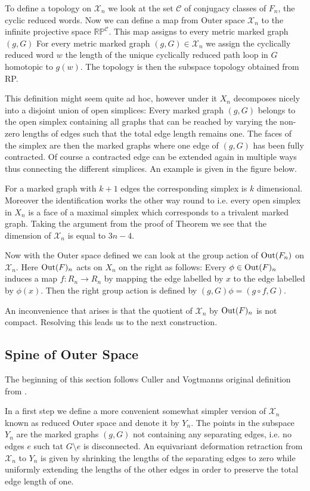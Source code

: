 To define a topology on $\mathcal{X}_{n}$ we look at the set $\mathcal{C}$ of conjugacy classes of $F_{n}$, the cyclic reduced words.
Now we can define a map from Outer space $\mathcal{X}_{n}$ to the infinite projective space $\mathbb{RP}^{\mathcal{C}}$.
This map assigns to every metric marked graph $(g,G)$
For every metric marked graph $(g,G) \in \mathcal{X}_{n}$ we assign the cyclically reduced word $w$
the length of the unique cyclically reduced path loop in $G$ homotopic to $g(w)$.
The topology is then the subspace topology obtained from RP.

This definition might seem quite ad hoc, however under it $X_{n}$ decomposes nicely into
a disjoint union of open simplices: Every marked graph $(g,G)$ belongs to the open simplex
containing all graphs that can be reached by varying the non-zero lengths of edges such that
the total edge length remains one. The faces of the simplex are then the marked graphs where one edge of $(g,G)$
has been fully contracted. Of course a contracted edge can be extended again in multiple ways thus connecting
the different simplices. An example is given in the figure below.

For a marked graph with $k+1$ edges the corresponding simplex is $k$ dimensional.
Moreover the identification works the other way round to i.e. every open simplex in $X_{n}$ 
is a face of a maximal simplex which corresponds to a trivalent marked graph.
Taking the argument from the proof of Theorem \label{thm:finGenCn} we see that the dimension of $\mathcal{X}_{n}$ is equal to $3n -4$.

Now with the Outer space defined we can look at the group action of $\operatorname{Out}(F_{n})$ on $\mathcal{X}_{n}$.
Here $\operatorname{Out}(F)_{n}$ acts on $X_{n}$ on the right as follows:
Every $\phi \in \operatorname{Out}(F)_{n}$ induces a map $f: R_{n} \to R_{n}$ by mapping the edge labelled
by $x$ to the edge labelled by $\phi(x)$.
Then the right group action is defined by $(g,G) \phi = (g \circ f, G)$.

An inconvenience that arises is that the quotient of $\mathcal{X}_{n}$ by $\operatorname{Out}(F)_{n}$ is not compact.
Resolving this leads us to the next construction.

\subsection{Spine of Outer Space}
The beginning of this section follows Culler and Vogtmanns original definition from \cite{vogtmann86}.

In a first step we define a more convenient somewhat simpler version of $\mathcal{X}_{n}$ known as reduced Outer space and denote it by $Y_{n}$.
The points in the subspace $Y_{n}$ are the marked graphs $(g,G)$ not containing any separating edges, i.e.
no edges $e$ such tat $G \setminus e$ is disconnected.
An equivariant deformation retraction from $\mathcal{X}_{n}$ to $Y_{n}$ is given by shrinking the lengths of
the separating edges to zero while uniformly extending the lengths of the other edges in order to preserve the total edge length of one.

